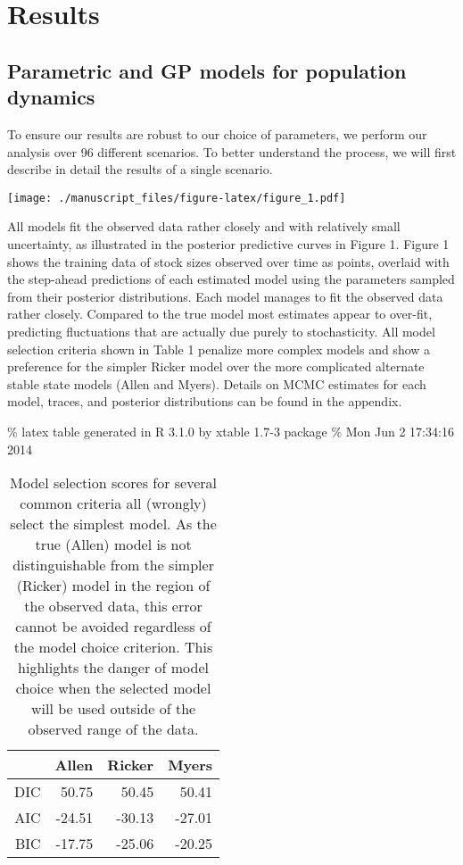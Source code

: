 \documentclass[]{components/elsarticle}
\begin{document}
\section{Results}\label{results}

\subsection{Parametric and GP models for population
dynamics}\label{parametric-and-gp-models-for-population-dynamics}

To ensure our results are robust to our choice of parameters, we perform
our analysis over 96 different scenarios. To better understand the
process, we will first describe in detail the results of a single
scenario.

\texttt{[image: ./manuscript\_files/figure-latex/figure\_1.pdf]}

All models fit the observed data rather closely and with relatively
small uncertainty, as illustrated in the posterior predictive curves in
Figure 1. Figure 1 shows the training data of stock sizes observed over
time as points, overlaid with the step-ahead predictions of each
estimated model using the parameters sampled from their posterior
distributions. Each model manages to fit the observed data rather
closely. Compared to the true model most estimates appear to over-fit,
predicting fluctuations that are actually due purely to stochasticity.
All model selection criteria shown in Table 1 penalize more complex
models and show a preference for the simpler Ricker model over the more
complicated alternate stable state models (Allen and Myers). Details on
MCMC estimates for each model, traces, and posterior distributions can
be found in the appendix.

\% latex table generated in R 3.1.0 by xtable 1.7-3 package \% Mon Jun 2
17:34:16 2014

\begin{table}[ht]
\centering
\begin{tabular}{rrrr}
  \hline
 & Allen & Ricker & Myers \\ 
  \hline
DIC & 50.75 & 50.45 & 50.41 \\ 
  AIC & -24.51 & -30.13 & -27.01 \\ 
  BIC & -17.75 & -25.06 & -20.25 \\ 
   \hline
\end{tabular}
\caption{Model selection scores for several common criteria all (wrongly) select the simplest model. As the true (Allen) model is not distinguishable from the simpler (Ricker) model in the region of the observed data, this error cannot be avoided regardless of the model choice criterion. This highlights the danger of model choice when the selected model will be used outside of the observed range of the data.} 
\end{table}
\end{document}
